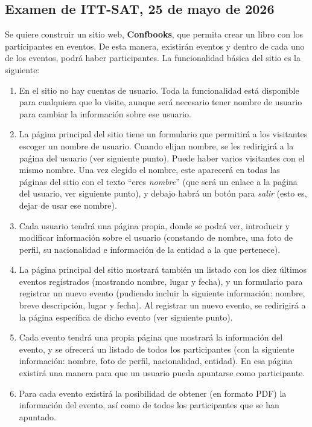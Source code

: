 \subsection{Examen de ITT-SAT, 25 de mayo de 2026}

Se quiere construir un sitio web, {\bf Confbooks}, que permita crear un libro con los participantes en eventos. De esta manera, existirán eventos y dentro de cada uno de los eventos, podrá haber participantes. La funcionalidad básica del sitio es la siguiente:

\begin{enumerate}
    \item En el sitio no hay cuentas de usuario. Toda la funcionalidad está disponible para cualquiera que lo visite, aunque será necesario tener nombre de usuario para cambiar la información sobre ese usuario.
    \item La página principal del sitio tiene un formulario que permitirá a los visitantes escoger un nombre de usuario. Cuando elijan nombre, se les redirigirá a la paǵina del usuario (ver siguiente punto). Puede haber varios visitantes con el mismo nombre. Una vez elegido el nombre, este aparecerá en todas las páginas del sitio con el texto ``eres \emph{nombre}'' (que será un enlace a la paǵina del usuario, ver siguiente punto), y debajo habrá un botón para \emph{salir} (esto es, dejar de usar ese nombre).
    \item Cada usuario tendrá una página propia, donde se podrá ver, introducir y modificar información sobre el usuario (constando de nombre, una foto de perfil, su nacionalidad e información de la entidad a la que pertenece).
    \item La página principal del sitio mostrará también un listado con los diez últimos eventos registrados (mostrando nombre, lugar y fecha), y un formulario para registrar un nuevo evento (pudiendo incluir la siguiente información: nombre, breve descripción, lugar y fecha). Al registrar un nuevo evento, se redirigirá a la página específica de dicho evento (ver siguiente punto).
    \item Cada evento tendrá una propia página que mostrará la información del evento, y se ofrecerá un listado de todos los participantes (con la siguiente información: nombre, foto de perfil, nacionalidad, entidad). En esa página existirá una manera para que un usuario pueda apuntarse como participante.
    \item Para cada evento existirá la posibilidad de obtener (en formato PDF) la información del evento, así como de todos los participantes que se han apuntado.
\end{enumerate}

